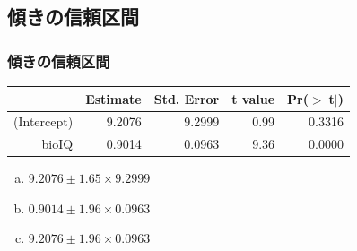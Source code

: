 
\subsection{傾きの信頼区間}


\begin{frame}
\frametitle{傾きの信頼区間}


{\footnotesize
\begin{center}
\begin{tabular}{rrrrr}
  \hline
 & Estimate & Std. Error & t value & Pr($>$$|$t$|$) \\
  \hline
(Intercept) & 9.2076 & 9.2999 & 0.99 & 0.3316 \\
  bioIQ & 0.9014 & 0.0963 & 9.36 & 0.0000 \\
   \hline
\end{tabular}
\end{center}
}

\vspace{-0.5cm}

{
\begin{enumerate}[(a)]
\item $9.2076 \pm 1.65 \times 9.2999$
\item $0.9014 \pm 1.96 \times 0.0963$
\item $9.2076 \pm 1.96 \times 0.0963$
\end{enumerate}
}
{
}

\end{frame}


